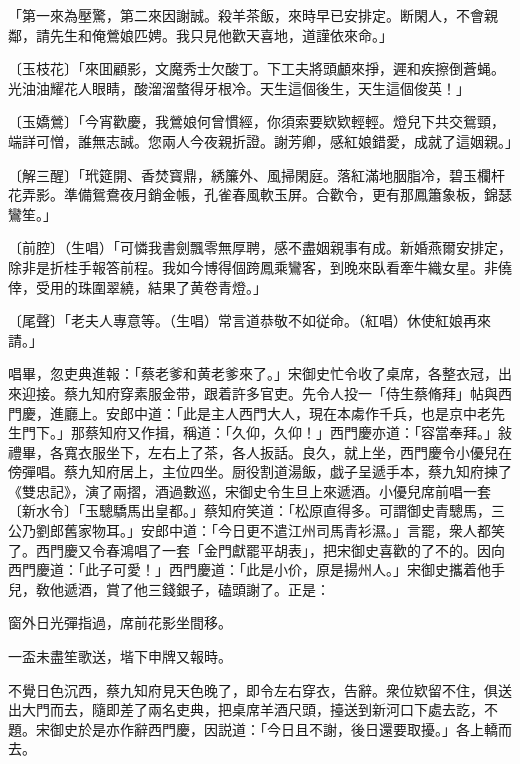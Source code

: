 \begin{myquote}
「第一來為壓驚，第二來因謝誠。殺羊茶飯，來時早已安排定。断閑人，不會親鄰，請先生和俺鶯娘匹娉。我只見他歡天喜地，道謹依來命。」

{\markfont〔玉枝花〕}「來囬顧影，文魔秀士欠酸丁。下工夫將頭顱來掙，遲和疾擦倒蒼蝇。光油油耀花人眼睛，酸溜溜螫得牙根冷。天生這個後生，天生這個俊英！」

{\markfont〔玉嬌鶯〕}「今宵歡慶，我鶯娘何曾慣經，你須索要欵欵輕輕。燈兒下共交鴛頸，端詳可憎，誰無志誠。您兩人今夜親折證。謝芳卿，感紅娘錯愛，成就了這姻親。」

{\markfont〔解三醒〕}「玳筵開、香焚寳鼎，綉簾外、風掃閑庭。落紅滿地胭脂冷，碧玉欄杆花弄影。準備鴛鴦夜月銷金帳，孔雀春風軟玉屏。合歡令，更有那鳳簫象板，錦瑟鸞笙。」

{\markfont〔前腔〕{\small（生唱）}}「可憐我書劍飄零無厚聘，感不盡姻親事有成。新婚燕爾安排定，除非是折桂手報答前程。我如今博得個跨鳳乘鸞客，到晚來臥看牽牛織女星。非僥倖，受用的珠圍翠繞，結果了黄卷青燈。」

{\markfont〔尾聲〕}「老夫人專意等。{\marktext\small（生唱）}常言道恭敬不如従命。{\marktext\small（紅唱）}休使紅娘再來請。」
\end{myquote}

唱畢，忽吏典進報：「蔡老爹和黄老爹來了。」宋御史忙令收了桌席，各整衣冠，出來迎接。蔡九知府穿素服金带，跟着許多官吏。先令人投一「侍生蔡脩拜」帖與西門慶，進廳上。安郎中道：「此是主人西門大人，現在本䖏作千兵，也是京中老先生門下。」那蔡知府又作揖，稱道：「久仰，久仰！」西門慶亦道：「容當奉拜。」敍禮畢，各寬衣服坐下，左右上了茶，各人扳話。良久，就上坐，西門慶令小優兒在傍彈唱。蔡九知府居上，主位四坐。厨役割道湯飯，戯子呈遞手本，蔡九知府揀了《雙忠記》，演了兩摺，酒過數巡，宋御史令生旦上來遞酒。小優兒席前唱一套〔新水令〕「玉驄驕馬出皇都。」蔡知府笑道：「松原直得多。可謂御史青驄馬，三公乃劉郎舊家物耳。」安郎中道：「今日更不遣江州司馬青衫濕。」言罷，衆人都笑了。西門慶又令春鴻唱了一套「金門獻罷平胡表」，把宋御史喜歡的了不的。因向西門慶道：「此子可愛！」西門慶道：「此是小价，原是揚州人。」宋御史攜着他手兒，敎他遞酒，賞了他三錢銀子，磕頭謝了。正是：

\begin{myquote}
窗外日光彈指過，席前花影坐間移。

一盃未盡笙歌送，堦下申牌又報時。
\end{myquote}

不覺日色沉西，蔡九知府見天色晚了，即令左右穿衣，告辭。衆位欵留不住，俱送出大門而去，隨即差了兩名吏典，把桌席羊酒尺頭，擡送到新河口下處去訖，不題。宋御史於是亦作辭西門慶，因説道：「今日且不謝，後日還要取擾。」各上轎而去。

